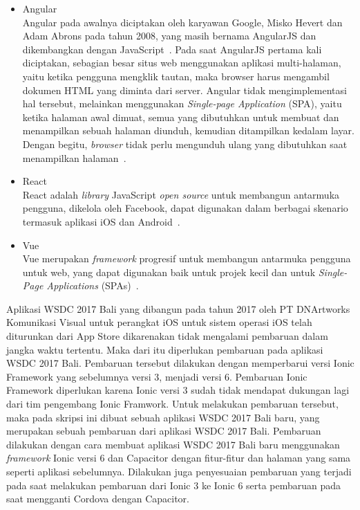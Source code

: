 \begin{itemize}
	\item Angular \\
	Angular pada awalnya diciptakan oleh karyawan Google, Misko Hevert dan Adam Abrons pada tahun 2008, yang masih bernama AngularJS dan dikembangkan dengan JavaScript~\cite{wohlgethan:18:supporting}. Pada saat AngularJS pertama kali diciptakan, sebagian besar situs web menggunakan aplikasi multi-halaman, yaitu ketika pengguna mengklik tautan, maka browser harus mengambil dokumen HTML yang diminta dari server. Angular tidak mengimplementasi hal tersebut, melainkan menggunakan \textit{Single-page Application} (SPA), yaitu ketika halaman awal dimuat, semua yang dibutuhkan untuk membuat dan menampilkan sebuah halaman diunduh, kemudian ditampilkan kedalam layar. Dengan begitu, \textit{browser} tidak perlu  mengunduh ulang yang dibutuhkan saat menampilkan halaman~\cite{scott:15:spa}.
	
	\item React \\
	React adalah \textit{library} JavaScript {\it open source} untuk membangun antarmuka pengguna, dikelola oleh Facebook, dapat digunakan dalam berbagai skenario termasuk aplikasi iOS dan Android~\cite{wohlgethan:18:supporting}.
	
	\item Vue \\
	 Vue merupakan \textit{framework} progresif untuk membangun antarmuka pengguna untuk web, yang dapat digunakan baik untuk projek kecil dan untuk {\it Single-Page Applications} (SPAs)~\cite{wohlgethan:18:supporting}.
\end{itemize}

Aplikasi WSDC 2017 Bali yang dibangun pada tahun 2017 oleh PT DNArtworks Komunikasi Visual untuk perangkat iOS untuk sistem operasi iOS telah diturunkan dari App Store dikarenakan tidak mengalami pembaruan dalam jangka waktu tertentu. Maka dari itu diperlukan pembaruan pada aplikasi WSDC 2017 Bali. Pembaruan tersebut dilakukan dengan memperbarui versi Ionic Framework yang sebelumnya versi 3, menjadi versi 6. Pembaruan Ionic Framework diperlukan karena Ionic versi 3 sudah tidak mendapat dukungan lagi dari tim pengembang Ionic Framwork. Untuk melakukan pembaruan tersebut, maka pada skripsi ini dibuat sebuah aplikasi WSDC 2017 Bali baru, yang merupakan sebuah pembaruan dari aplikasi WSDC 2017 Bali. Pembaruan dilakukan dengan cara membuat aplikasi WSDC 2017 Bali baru menggunakan \textit{framework} Ionic versi 6 dan Capacitor dengan fitur-fitur dan halaman yang sama seperti aplikasi sebelumnya. Dilakukan juga penyesuaian pembaruan yang terjadi pada saat melakukan pembaruan dari Ionic 3 ke Ionic 6 serta pembaruan pada saat mengganti Cordova dengan Capacitor. 

